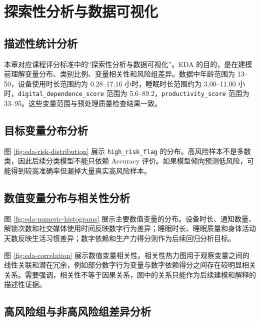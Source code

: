\chapter{探索性分析与数据可视化}

\section{描述性统计分析}

本章对应课程评分标准中的“探索性分析与数据可视化”。EDA 的目的，是在建模前理解变量分布、类别比例、变量相关性和风险组差异。数据中年龄范围为 13--50，设备使用时长范围约为 0.28--17.16 小时，睡眠时长范围约为 3.00--11.00 小时，\texttt{digital\_dependence\_score} 范围为 5.6--89.2，\texttt{productivity\_score} 范围为 33--95。这些变量范围与预处理质量检查结果一致。

\section{目标变量分布分析}

图 \ref{fig:eda-risk-distribution} 展示 \texttt{high\_risk\_flag} 的分布。高风险样本不是多数类，因此后续分类模型不能只依赖 Accuracy 评价。如果模型倾向预测低风险，可能得到较高准确率但漏掉大量真实高风险样本。


\section{数值变量分布与相关性分析}

图 \ref{fig:eda-numeric-histograms} 展示主要数值变量的分布。设备时长、通知数量、解锁次数和社交媒体使用时间反映数字行为差异；睡眠时长、睡眠质量和身体活动天数反映生活习惯差异；数字依赖和生产力得分则作为后续回归分析目标。


图 \ref{fig:eda-correlation} 展示数值变量相关性。相关性热力图用于观察变量之间的线性关联和潜在冗余，例如部分数字行为变量与数字依赖得分之间存在较明显相关关系。需要强调，相关性不等于因果关系，图中的关系只能作为后续建模和解释的描述性证据。


\section{高风险组与非高风险组差异分析}

